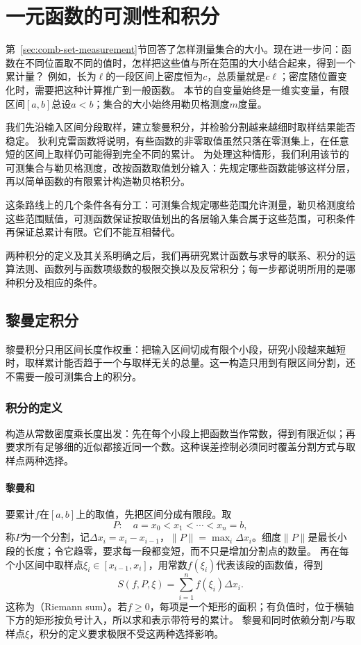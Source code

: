 \section{一元函数的可测性和积分}
\label{sec:analysis-measurability-integration}
\label{sec:analysis-integration-average}
\label{sec:analysis-classical-integration}

第~\ref{sec:comb-set-measurement}节回答了怎样测量集合的大小。现在进一步问：函数在不同位置取不同的值时，怎样把这些值与所在范围的大小结合起来，得到一个累计量？
例如，长为$\ell$的一段区间上密度恒为$c$，总质量就是$c\ell$；密度随位置变化时，需要把这种计算推广到一般函数。
本节的自变量始终是一维实变量，有限区间$[a,b]$总设$a<b$；集合的大小始终用勒贝格测度$m$度量。

我们先沿输入区间分段取样，建立黎曼积分，并检验分割越来越细时取样结果能否稳定。
狄利克雷函数将说明，有些函数的非零取值虽然只落在零测集上，在任意短的区间上取样仍可能得到完全不同的累计。
为处理这种情形，我们利用该节的可测集合与勒贝格测度，改按函数取值划分输入：先规定哪些函数能够这样分层，再以简单函数的有限累计构造勒贝格积分。

这条路线上的几个条件各有分工：可测集合规定哪些范围允许测量，勒贝格测度给这些范围赋值，可测函数保证按取值划出的各层输入集合属于这些范围，可积条件再保证总累计有限。它们不能互相替代。

两种积分的定义及其关系明确之后，我们再研究累计函数与求导的联系、积分的运算法则、函数列与函数项级数的极限交换以及反常积分；每一步都说明所用的是哪种积分及相应的条件。

\subsection{黎曼定积分}
\label{sec:analysis-integral-definitions}
\label{sec:analysis-riemann-integral}

黎曼积分只用区间长度作权重：把输入区间切成有限个小段，研究小段越来越短时，取样累计能否趋于一个与取样无关的总量。这一构造只用到有限区间分割，还不需要一般可测集合上的积分。


\subsubsection{积分的定义}

构造从常数密度乘长度出发：先在每个小段上把函数当作常数，得到有限近似；再要求所有足够细的近似都接近同一个数。这种误差控制必须同时覆盖分割方式与取样点两种选择。


\paragraph{黎曼和}
要累计$f$在$[a,b]$上的取值，先把区间分成有限段。取
\[
 P:\quad a=x_0<x_1<\cdots<x_n=b,
\]
称$P$为一个分割，记$\Delta x_i=x_i-x_{i-1}$，$\lVert P\rVert=\max_i\Delta x_i$。细度$\lVert P\rVert$是最长小段的长度；令它趋零，要求每一段都变短，而不只是增加分割点的数量。
再在每个小区间中取样点$\xi_i\in[x_{i-1},x_i]$，用常数$f(\xi_i)$代表该段的函数值，得到
\[
 S(f,P,\xi)=\sum_{i=1}^n f(\xi_i)\Delta x_i.
\]
这称为（Riemann sum）。若$f\geq0$，每项是一个矩形的面积；有负值时，位于横轴下方的矩形按负号计入，所以求和表示带符号的累计。
黎曼和同时依赖分割$P$与取样点$\xi$，积分的定义要求极限不受这两种选择影响。

